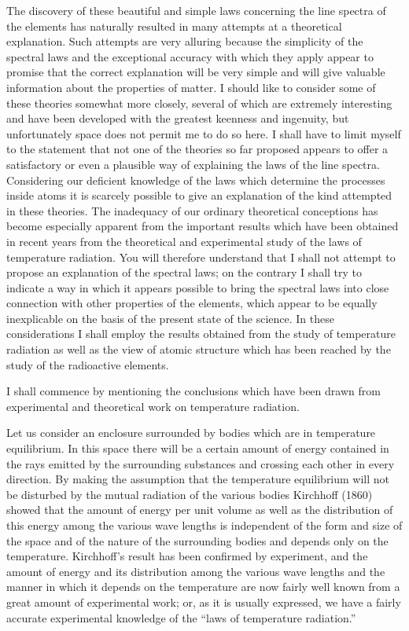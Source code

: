 The discovery of these beautiful and simple laws concerning the
line spectra of the elements has naturally resulted in many attempts
at a theoretical explanation. Such attempts are very alluring
because the simplicity of the spectral laws and the exceptional accuracy
with which they apply appear to promise that the correct explanation
will be very simple and will give valuable information
about the properties of matter. I should like to consider some of
these theories somewhat more closely, several of which are extremely
interesting and have been developed with the greatest keenness
and ingenuity, but unfortunately space does not permit me to do
so here. I shall have to limit myself to the statement that not
one of the theories so far proposed appears to offer a satisfactory or
even a plausible way of explaining the laws of the line spectra.
Considering our deficient knowledge of the laws which determine
the processes inside atoms it is scarcely possible to give an explanation
of the kind attempted in these theories. The inadequacy of
our ordinary theoretical conceptions has become especially apparent
from the important results which have been obtained in recent years
from the theoretical and experimental study of the laws of temperature
radiation. You will therefore understand that I shall not
attempt to propose an explanation of the spectral laws; on the
contrary I shall try to indicate a way in which it appears possible
to bring the spectral laws into close connection with other properties
of the elements, which appear to be equally inexplicable on
the basis of the present state of the science. In these considerations
I shall employ the results obtained from the study of temperature
radiation as well as the view of atomic structure which has been
reached by the study of the radioactive elements.

 I shall commence by mentioning
the conclusions which have been drawn from experimental
and theoretical work on temperature radiation.

Let us consider an enclosure surrounded by bodies which are in
temperature equilibrium. In this space there will be a certain
amount of energy contained in the rays emitted by the surrounding
substances and crossing each other in every direction. By making
the assumption that the temperature equilibrium will not be disturbed
by the mutual radiation of the various bodies Kirchhoff
(1860) showed that the amount of energy per unit volume as well
as the distribution of this energy among the various wave lengths
is independent of the form and size of the space and of the nature
of the surrounding bodies and depends only on the temperature.
Kirchhoff's result has been confirmed by experiment, and the
amount of energy and its distribution among the various wave
lengths and the manner in which it depends on the temperature
are now fairly well known from a great amount of experimental
work; or, as it is usually expressed, we have a fairly
accurate experimental knowledge of the ``laws of temperature
radiation.''

